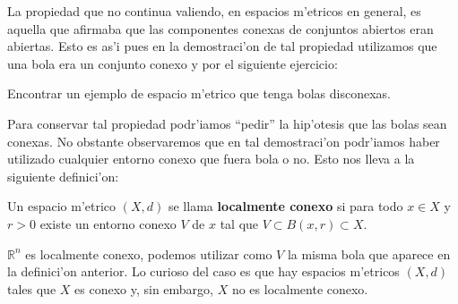La propiedad que no continua valiendo, en espacios m'etricos en
general, es aquella que afirmaba que las componentes conexas de
conjuntos abiertos eran abiertas. Esto es as'i pues en la
demostraci'on de tal propiedad utilizamos que una bola era un
conjunto conexo y por el siguiente ejercicio:

\begin{ejercicio} Encontrar un ejemplo de espacio m'etrico que
tenga bolas disconexas.
\end{ejercicio}

Para conservar tal propiedad podr'iamos ``pedir'' la hip'otesis que
las bolas sean conexas. No obstante observaremos que en tal demostraci'on
podr'iamos haber utilizado cualquier entorno conexo que fuera bola o no.
Esto nos lleva a la siguiente definici'on:

\begin{definicion} Un espacio m'etrico $(X,d)$ se llama
\textbf{localmente conexo} si para todo $x\in X$ y $r>0$
existe un entorno conexo $V$ de $x$ tal que $V\subset B(x,r)\subset X$.
\end{definicion}

$\mathbb{R}^n$ es localmente conexo, podemos utilizar como $V$ la
 misma bola que aparece en la definici'on anterior. Lo curioso del
 caso es que hay espacios m'etricos $(X,d)$ tales que $X$ es conexo
 y, sin embargo, $X$ no es localmente conexo.

